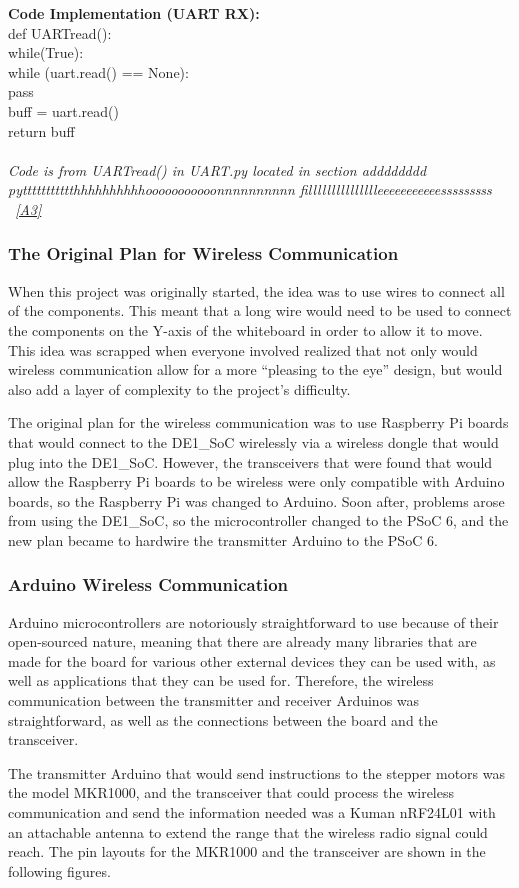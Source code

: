 \noindent \textbf{Code Implementation (UART RX):}\\ 
def UARTread():\\
  while(True):\\
    while (uart.read() == None):\\
      pass\\
    buff = uart.read()\\
    return buff\\\\
\textit{Code is from UARTread() in UART.py located in section adddddddd pyttttttttttthhhhhhhhhhooooooooooonnnnnnnnnn fillllllllllllllleeeeeeeeeeesssssssss ~\ref{A3}}\\

\subsubsection{The Original Plan for Wireless Communication}

When this project was originally started, the idea was to use wires to connect all of the components. This meant that a long wire would need to be used to connect the components on the Y-axis of the whiteboard in order to allow it to move. This idea was scrapped when everyone involved realized that not only would wireless communication allow for a more “pleasing to the eye” design, but would also add a layer of complexity to the project’s difficulty. \par
\setlength{\parindent}{2.5ex}
The original plan for the wireless communication was to use Raspberry Pi boards that would connect to the DE1\_SoC wirelessly via a wireless dongle that would plug into the DE1\_SoC. However, the transceivers that were found that would allow the Raspberry Pi boards to be wireless were only compatible with Arduino boards, so the Raspberry Pi was changed to Arduino. Soon after, problems arose from using the DE1\_SoC, so the microcontroller changed to the PSoC 6, and the new plan became to hardwire the transmitter Arduino to the PSoC 6. \\

\subsubsection{Arduino Wireless Communication}

Arduino microcontrollers are notoriously straightforward to use because of their open-sourced nature, meaning that there are already many libraries that are made for the board for various other external devices they can be used with, as well as applications that they can be used for. Therefore, the wireless communication between the transmitter and receiver Arduinos was straightforward, as well as the connections between the board and the transceiver. \par
\setlength{\parindent}{2.5ex}
The transmitter Arduino that would send instructions to the stepper motors was the model MKR1000, and the transceiver that could process the wireless communication and send the information needed was a Kuman nRF24L01 with an attachable antenna to extend the range that the wireless radio signal could reach. The pin layouts for the MKR1000 and the transceiver are shown in the following figures.

